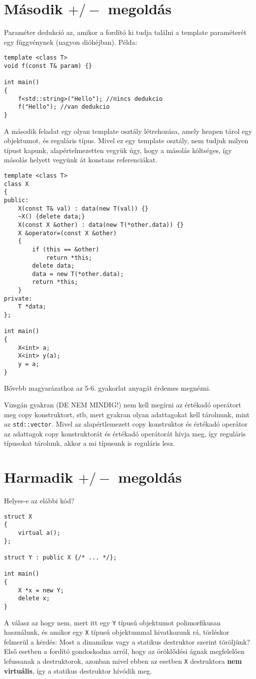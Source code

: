 \documentclass[a4paper,11.5pt]{article}
\begin{document}
	\section{Második $+/-$ megoldás}
	Paraméter dedukció az, amikor a fordító ki tudja találni a template paraméterét egy függvénynek (nagyon dióhéjban). Példa:
	\begin{lstlisting}
template <class T>
void f(const T& param) {}

int main()
{
	f<std::string>("Hello"); //nincs dedukcio
	f("Hello"); //van dedukcio
}
	\end{lstlisting}
	
	A második feladat egy olyan template osztály létrehozása, amely heapen tárol egy objektumot, és reguláris típus. Mivel ez egy template osztály, nem tudjuk milyen típust kapunk, alapértelmezetten vegyük úgy, hogy a másolás költséges, így másolás helyett vegyünk át konstans referenciákat.
	\begin{lstlisting}
template <class T>
class X
{
public:
	X(const T& val) : data(new T(val)) {}
	~X() {delete data;}
	X(const X &other) : data(new T(*other.data)) {}
	X &operator=(const X &other)
	{
		if (this == &other)
			return *this;
		delete data;
		data = new T(*other.data);
		return *this;
	}
private:
	T *data;
};

int main()
{
	X<int> a;
	X<int> y(a);
	y = a;
}
	\end{lstlisting}
	Bővebb magyarázathoz az 5-6. gyakorlat anyagát érdemes megnézni.
	
	\medskip
	Vizsgán gyakran (DE NEM MINDIG!) nem kell megírni az értékadó operátort meg copy konstruktort, stb, mert gyakran olyan adattagokat kell tárolnunk, mint az \texttt{std::vector}. Mivel az alapértlemezett copy konstruktor és értékadó operátor az adattagok copy konstruktorát és értékadó operátorát hívja meg, így reguláris típusokat tárolunk, akkor a mi típusunk is reguláris lesz.
	\section{Harmadik $+/-$ megoldás}
	Helyes-e az elábbi kód?
		
	\begin{lstlisting}
struct X
{
	virtual a();
};

struct Y : public X {/* ... */};

int main()
{
	X *x = new Y;
	delete x;
}
	\end{lstlisting}
		
	A válasz az hogy nem, mert itt egy \texttt{Y} típusú objektumot polimorfikusan használunk, és amikor egy \texttt{X} típusú objektummal hivatkozunk rá, törléskor felmerül a kérdés: Most a dinamikus vagy a statikus destruktor szerint töröljünk? Első esetben a fordító gondoskodna arról, hogy az öröklődési ágnak megfelelően lefussanak a destruktorok, azonban mivel ebben az esetben \texttt{X} destruktora \textbf{nem virtuális}, így a statikus destruktor hívódik meg. 
	
\end{document}
